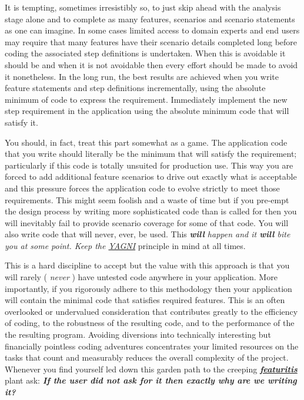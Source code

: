 It is tempting, sometimes irresistibly so, to just skip ahead with the analysis stage alone and to complete as many features, scenarios and scenario statements as one can imagine.  In some cases limited access to domain experts and end users may require that many features have their scenario details completed long before coding the associated step definitions is undertaken. When this is avoidable it should be and when it is not avoidable then every effort should be made to avoid it nonetheless.  In the long run, the best results are achieved when you write feature statements and step definitions incrementally, using the absolute minimum of code to express the requirement. Immediately implement the new step requirement in the application using the absolute minimum code that will satisfy it.

You should, in fact, treat this part somewhat as a game.  The application code that you write should literally be the minimum that will satisfy the requirement; particularly if this code is totally unsuited for production use.  This way you are forced to add additional feature scenarios to drive out exactly what is acceptable and this pressure forces the application code to evolve strictly to meet those requirements.  This might seem foolish and a waste of time but if you pre-empt the design process by writing more sophisticated code than is called for then you will inevitably fail to provide scenario coverage for some of that code.  You will also write code that will never, ever, be used. This \emph{\textbf{will} happen and it \emph{\textbf{will}} bite you at some point. Keep the \href{http://en.wikipedia.org/wiki/You_ain\%27t_gonna_need_it}{YAGNI}} principle in mind at all times.

This is a hard discipline to accept but the value with this approach is that you will rarely ( \emph{never} ) have untested code anywhere in your application.  More importantly, if you rigorously adhere to this methodology then your application will contain the minimal code that satisfies required features.  This is an often overlooked or undervalued consideration that contributes greatly to the efficiency of coding, to the robustness of the resulting code, and to the performance of the the resulting program.  Avoiding diversions into technically interesting but financially pointless coding adventures concentrates your limited resources on the tasks that count and measurably reduces the overall complexity of the project.  Whenever you find yourself led down this garden path to the creeping \href{http://en.wikipedia.org/wiki/Feature_creep}{\textbf{\emph{featuritis}}} plant ask: \textbf{\emph{If the user did not ask for it then exactly why are we writing it?}}

